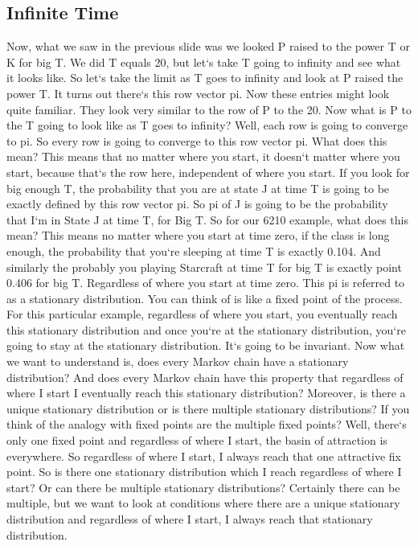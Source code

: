 \subsection{Infinite Time}
Now, what we saw in the previous slide was we looked P raised to the power T or K for big T\@.
We did T equals 20, but let`s take T going to infinity and see what it looks like.
So let`s take the limit as T goes to infinity and look at P raised the power T\@.
It turns out there`s this row vector pi.
Now these entries might look quite familiar.
They look very similar to the row of P to the 20.
Now what is P to the T going to look like as T goes to infinity? Well, each row is going to converge to pi.
So every row is going to converge to this row vector pi.
What does this mean? This means that no matter where you start, it doesn`t matter where you start, because that`s the row here, independent of where you start.
If you look for big enough T, the probability that you are at state J at time T is going to be exactly defined by this row vector pi.
So pi of J is going to be the probability that I`m in State J at time T, for Big T\@.
So for our 6210 example, what does this mean? This means no matter where you start at time zero, if the class is long enough, the probability that you`re sleeping at time T is exactly 0.104.
And similarly the probably you playing Starcraft at time T for big T is exactly point 0.406 for big T\@.
Regardless of where you start at time zero.
This pi is referred to as a stationary distribution.
You can think of is like a fixed point of the process.
For this particular example, regardless of where you start, you eventually reach this stationary distribution and once you`re at the stationary distribution, you`re going to stay at the stationary distribution.
It`s going to be invariant.
Now what we want to understand is, does every Markov chain have a stationary distribution? And does every Markov chain have this property that regardless of where I start I eventually reach this stationary distribution? Moreover, is there a unique stationary distribution or is there multiple stationary distributions? If you think of the analogy with fixed points are the multiple fixed points? Well, there`s only one fixed point and regardless of where I start, the basin of attraction is everywhere.
So regardless of where I start, I always reach that one attractive fix point.
So is there one stationary distribution which I reach regardless of where I start? Or can there be multiple stationary distributions? Certainly there can be multiple, but we want to look at conditions where there are a unique stationary distribution and regardless of where I start, I always reach that stationary distribution.
